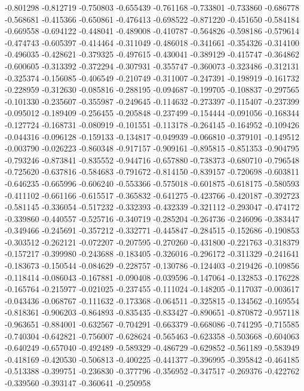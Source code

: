 -0.801298
-0.812719
-0.750803
-0.655439
-0.761168
-0.733801
-0.733860
-0.686778
-0.568681
-0.415366
-0.650861
-0.476413
-0.698522
-0.871220
-0.451650
-0.584184
-0.669558
-0.694122
-0.448041
-0.489008
-0.410787
-0.564826
-0.598186
-0.579614
-0.474743
-0.605397
-0.414464
-0.311049
-0.486018
-0.341661
-0.354326
-0.314100
-0.496035
-0.428621
-0.379325
-0.497615
-0.430041
-0.389129
-0.415747
-0.364862
-0.600605
-0.313392
-0.372294
-0.307931
-0.355747
-0.360073
-0.323486
-0.312131
-0.325374
-0.156085
-0.406549
-0.210749
-0.311007
-0.247391
-0.198919
-0.161732
-0.228959
-0.312630
-0.085816
-0.288195
-0.094687
-0.199705
-0.108837
-0.297565
-0.101330
-0.235607
-0.355987
-0.249645
-0.114632
-0.273397
-0.115407
-0.237399
-0.095012
-0.189409
-0.256455
-0.205848
-0.237499
-0.154444
-0.091056
-0.168344
-0.127724
-0.168731
-0.080919
-0.101551
-0.113178
-0.264145
-0.164952
-0.109426
-0.044316
-0.096128
-0.159133
-0.134817
-0.049939
-0.066810
-0.379101
-0.149512
-0.003790
-0.026223
-0.860348
-0.917157
-0.909161
-0.895815
-0.851353
-0.904795
-0.793246
-0.873841
-0.835552
-0.944716
-0.657880
-0.738373
-0.680710
-0.796548
-0.725620
-0.637816
-0.584683
-0.791672
-0.814150
-0.839157
-0.720698
-0.603811
-0.646235
-0.665996
-0.606240
-0.553366
-0.575018
-0.601875
-0.618175
-0.580593
-0.411102
-0.661166
-0.615517
-0.365832
-0.641275
-0.423766
-0.420187
-0.392723
-0.581145
-0.336054
-0.517232
-0.332393
-0.432339
-0.321112
-0.293047
-0.474172
-0.339860
-0.440557
-0.525716
-0.340719
-0.285204
-0.264736
-0.246096
-0.383447
-0.349466
-0.245691
-0.357212
-0.332771
-0.445847
-0.284515
-0.152686
-0.190853
-0.303512
-0.262121
-0.072207
-0.207595
-0.270260
-0.431800
-0.221763
-0.318379
-0.157217
-0.399980
-0.243688
-0.183405
-0.326016
-0.296172
-0.311329
-0.241641
-0.183673
-0.150544
-0.084629
-0.228757
-0.130786
-0.124403
-0.219426
-0.109856
-0.118414
-0.086043
-0.167881
-0.090408
-0.039596
-0.147064
-0.132853
-0.176228
-0.165764
-0.215977
-0.021025
-0.237455
-0.111024
-0.148205
-0.117037
-0.003617
-0.043436
-0.068767
-0.111632
-0.173368
-0.064511
-0.325815
-0.134562
-0.169554
-0.818361
-0.906203
-0.864893
-0.835435
-0.833427
-0.890651
-0.870872
-0.957118
-0.963651
-0.884001
-0.632567
-0.704291
-0.663379
-0.668086
-0.741295
-0.715585
-0.740304
-0.642821
-0.756007
-0.628624
-0.565463
-0.623358
-0.503668
-0.604063
-0.640249
-0.657040
-0.492489
-0.589329
-0.486729
-0.629852
-0.561189
-0.583949
-0.418169
-0.420530
-0.506813
-0.400225
-0.441377
-0.396995
-0.395842
-0.464185
-0.513388
-0.399751
-0.236830
-0.377796
-0.356952
-0.347517
-0.269376
-0.422762
-0.339560
-0.393147
-0.360641
-0.250958
